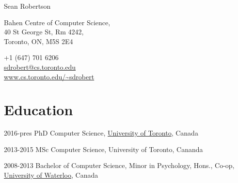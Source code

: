 \documentclass{article}
\begin{document}
\thispagestyle{empty}

\begin{center}
  \huge{Sean Robertson}
\end{center}
\vspace{\baselineskip}

\begin{center}
  \begin{minipage}{0.5\textwidth}
  \begin{flushleft}
    Bahen Centre of Computer Science, \\
    40 St George St, Rm 4242, \\
    Toronto, ON, M5S 2E4
  \end{flushleft}
  \end{minipage}
  \hfill
  \begin{minipage}{0.4\textwidth}
  \begin{flushright}
    +1 (647) 701 6206 \\
    \href{mailto:sdrobert@cs.toronto.edu}{sdrobert@cs.toronto.edu} \\
    \url{www.cs.toronto.edu/~sdrobert}
  \end{flushright}
  \end{minipage}
\end{center}

\section{Education}
\begin{CV}
  \item[2016-pres] PhD Computer Science,
    \href{https://www.utoronto.ca/}{University of Toronto}, Canada

  \item[2013-2015] MSc Computer Science, University of Toronto, Cananda

  \item[2008-2013] Bachelor of Computer Science, Minor in Psychology, Hons.,
    Co-op, \href{https://uwaterloo.ca/}{University of Waterloo}, Canada
\end{CV}
\end{document}
